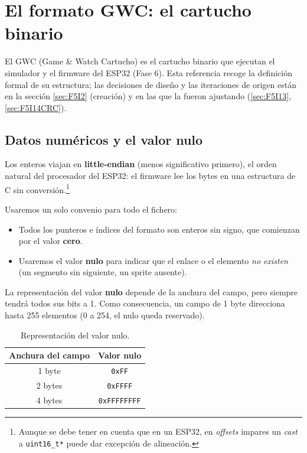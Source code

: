 \section{El formato GWC: el cartucho binario}
\label{sec:A02GWC}

El GWC (Game \& Watch Cartucho) es el cartucho binario que ejecutan el
simulador y el firmware del ESP32 (Fase 6). Esta referencia recoge la
definición formal de su estructura; las decisiones de diseño y las
iteraciones de origen están en la sección \ref{sec:F5I2} (creación) y en
las que la fueron ajustando (\ref{sec:F5I13}, \ref{sec:F5I14CRC}).

\subsection{Datos numéricos y el valor nulo}
\label{sec:A02GWCNulo}

Los enteros viajan en \textbf{little-endian} (menos significativo
primero), el orden natural del procesador del ESP32: el firmware lee
los bytes en una estructura de C sin conversión.\footnote{Aunque se debe tener en cuenta que en un ESP32, en \textit{offsets} impares un \textit{cast} a \texttt{uint16\_t*} puede dar excepción de alineación.}

Usaremos un solo convenio para todo el fichero:

\begin{itemize}
	\item Todos los punteros e índices del formato son enteros sin signo, que comienzan
	por el valor \textbf{cero}.
	
	\item Usaremos el valor \textbf{nulo} para indicar que el enlace o el elemento
	\emph{no existen} (un segmento sin siguiente, un sprite ausente).
\end{itemize}

La representación del valor \textbf{nulo} depende de la anchura del campo, pero siempre tendrá todos sus bits a 1. Como consecuencia, un campo de 1 byte direcciona hasta 255 elementos (0 a 254, el nulo queda reservado).

\begin{table}[H]
	\centering
	\begin{tabular}{|c|c|}
		\hline
		\textbf{Anchura del campo} & \textbf{Valor nulo} \\
		\hline
		1 byte  & \texttt{0xFF} \\ \hline
		2 bytes & \texttt{0xFFFF} \\ \hline
		4 bytes & \texttt{0xFFFFFFFF} \\ \hline
	\end{tabular}
	\caption{Representación del valor nulo.}
\end{table}

